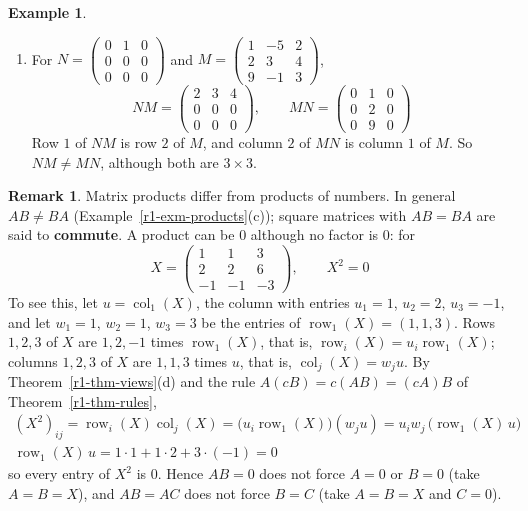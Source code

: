 \documentclass[12pt]{article}
\DeclareMathOperator{\row}{row}
\DeclareMathOperator{\col}{col}
\theoremstyle{definition}
\newtheorem{example}[theorem]{Example}
\newtheorem{remark}[theorem]{Remark}
\begin{document}
\begin{example}
\begin{enumerate}
\[\]
\item For \(N=\begin{pmatrix}0&1&0\\0&0&0\\0&0&0\end{pmatrix}\) and
\(M=\begin{pmatrix}1&-5&2\\2&3&4\\9&-1&3\end{pmatrix}\),
\[
NM=\begin{pmatrix}2&3&4\\0&0&0\\0&0&0\end{pmatrix},\qquad
MN=\begin{pmatrix}0&1&0\\0&2&0\\0&9&0\end{pmatrix}
\]
Row \(1\) of \(NM\) is row \(2\) of \(M\), and column \(2\) of \(MN\) is column \(1\) of \(M\).
So \(NM\ne MN\), although both are \(3\times3\).
\end{enumerate}
\end{example}

\begin{remark}\label{r1-rem-noncomm}
Matrix products differ from products of numbers. In general \(AB\ne BA\)
(Example~\ref{r1-exm-products}(c)); square matrices with \(AB=BA\) are said to
\textbf{commute}. A product can be \(0\) although no factor is \(0\): for
\[
X=\begin{pmatrix}1&1&3\\2&2&6\\-1&-1&-3\end{pmatrix},\qquad X^2=0
\]
To see this, let \(u=\col_1(X)\), the column with entries \(u_1=1\), \(u_2=2\), \(u_3=-1\), and let \(w_1=1\),
\(w_2=1\), \(w_3=3\) be the entries of \(\row_1(X)=(1,1,3)\). Rows \(1,2,3\) of \(X\) are \(1,2,-1\) times
\(\row_1(X)\), that is, \(\row_i(X)=u_i\row_1(X)\); columns \(1,2,3\) of \(X\) are \(1,1,3\) times \(u\), that
is, \(\col_j(X)=w_ju\). By Theorem~\ref{r1-thm-views}(d) and the rule \(A(cB)=c(AB)=(cA)B\) of
Theorem~\ref{r1-thm-rules},
\[
\begin{gathered}
(X^2)_{ij}=\row_i(X)\col_j(X)=\bigl(u_i\row_1(X)\bigr)(w_ju)=u_iw_j\,\bigl(\row_1(X)\,u\bigr)\\
\row_1(X)\,u=1\cdot1+1\cdot2+3\cdot(-1)=0
\end{gathered}
\]
so every entry of \(X^2\) is \(0\). Hence \(AB=0\) does not force \(A=0\) or \(B=0\) (take
\(A=B=X\)), and \(AB=AC\) does not force \(B=C\) (take \(A=B=X\) and \(C=0\)).
\end{remark}
\end{document}
